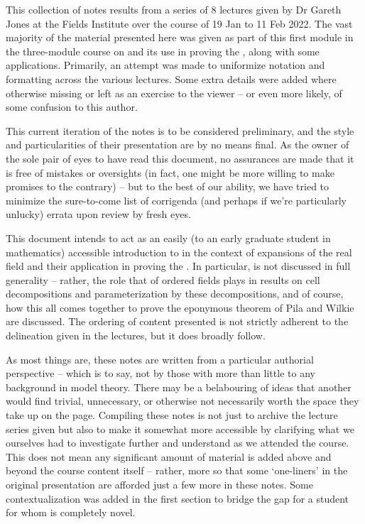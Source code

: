 %
%

\preface

This collection of notes results from a series of 8 lectures given by Dr Gareth Jones at the Fields Institute over the course of 19 Jan to 11 Feb 2022. The vast majority of the material presented here was given as part of this first module in the three-module course on \omy and its use in proving the \pwt, along with some applications. Primarily, an attempt was made to uniformize notation and formatting across the various lectures. Some extra details were added where otherwise missing or left as an exercise to the viewer -- or even more likely, of some confusion to this author.

This current iteration of the notes is to be considered preliminary, and the style and particularities of their presentation are by no means final. As the owner of the sole pair of eyes to have read this document, no assurances are made that it is free of mistakes or oversights (in fact, one might be more willing to make promises to the contrary) -- but to the best of our ability, we have tried to minimize the sure-to-come list of corrigenda (and perhaps if we're particularly unlucky) errata upon review by fresh eyes.
 
This document intends to act as an easily (to an early graduate student in mathematics) accessible introduction to \omy in the context of expansions of the real field and their application in proving the \pwt. In particular, \omy is not discussed in full generality -- rather, the role that \omy of ordered fields plays in results on cell decompositions and parameterization by these decompositions, and of course, how this all comes together to prove the eponymous theorem of Pila and Wilkie are discussed. The ordering of content presented is not strictly adherent to the delineation given in the lectures, but it does broadly follow.

As most things are, these notes are written from a particular authorial perspective -- which is to say, not by those with more than little to any background in model theory. There may be a belabouring of ideas that another would find trivial, unnecessary, or otherwise not necessarily worth the space they take up on the page. Compiling these notes is not just to archive the lecture series given but also to make it somewhat more accessible by clarifying what we ourselves had to investigate further and understand as we attended the course. This does not mean any significant amount of material is added above and beyond the course content itself -- rather, more so that some `one-liners' in the original presentation are afforded just a few more in these notes. Some contextualization was added in the first section to bridge the gap for a student for whom \omy is completely novel.

